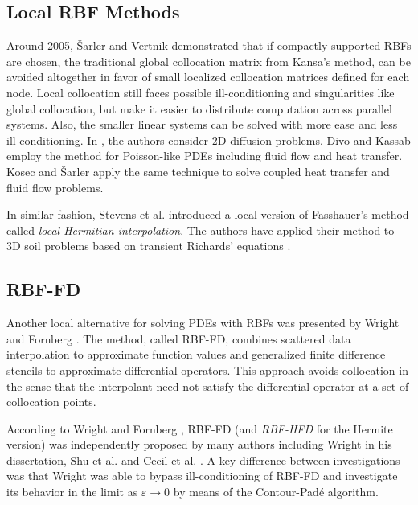 \documentclass{report}
\begin{document}
{\subsection{Local RBF Methods}
Around 2005, \v{S}arler and Vertnik \cite{Sarler2006, Vertnik2006} demonstrated that if compactly supported RBFs are chosen, the traditional global 
collocation matrix from Kansa's method, can be avoided altogether in favor of small localized collocation matrices defined for 
each node. Local collocation still faces possible ill-conditioning and singularities 
like global collocation, but make it easier to distribute computation across parallel systems. Also, the smaller linear systems can be 
solved 
with more ease and less ill-conditioning. In \cite{Sarler2006}, the authors consider 2D diffusion problems. Divo and Kassab \cite{Divo2007} %
employ the 
method for Poisson-like PDEs including fluid flow and heat transfer. Kosec and \v{S}arler \cite{Kosec2008} apply the 
same technique to solve coupled heat transfer and fluid flow problems.

In similar fashion, Stevens et al. \cite{Stevens2009a} introduced a local version of 
Fasshauer's method called \emph{local Hermitian interpolation}. The authors have applied their method to 3D soil 
problems based on transient Richards' equations \cite{Stevens2008a, Stevens:2009a, Stevens:2009b}.



\subsection{RBF-FD}

Another local alternative for solving PDEs with RBFs was presented by Wright and Fornberg \cite{Wright2004, Wright2006}. The method, called RBF-FD, combines scattered data interpolation to approximate function values and generalized finite difference stencils to approximate differential operators. This approach avoids collocation in the sense that the interpolant need not satisfy the differential operator at a set of collocation points. 

According to Wright and Fornberg \cite{Wright2004}, RBF-FD (and \emph{RBF-HFD} for the Hermite version) was independently 
proposed by many authors including Wright \cite{Wright2003} in his dissertation, Shu et al. \cite{Shu2003} and Cecil et al. \cite{Cecil2004}. A key difference between investigations was that Wright \cite{Wright2003} was able to bypass ill-conditioning of RBF-FD and investigate its behavior in the limit as $\varepsilon \rightarrow 0$ by means of the Contour-Pad\'{e} algorithm.

}
\end{document}
